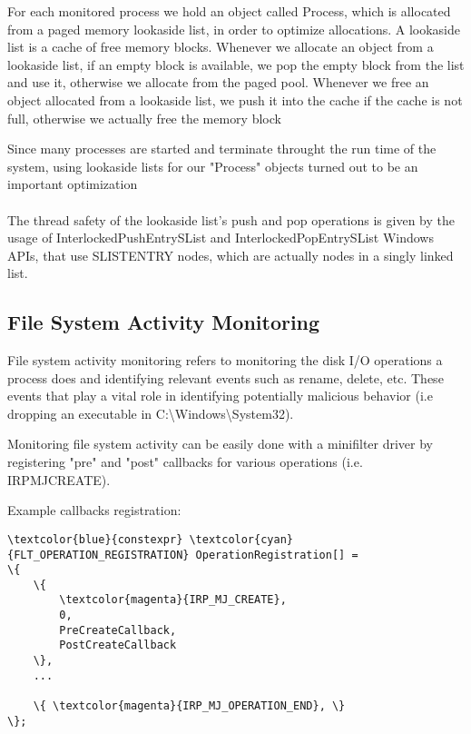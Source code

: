         For each monitored process we hold an object called Process, which is allocated from a paged memory lookaside list, in order to
        optimize allocations. A lookaside list is a cache of free memory blocks. Whenever we allocate an object from a lookaside list, if
        an empty block is available, we pop the empty block from the list and use it, otherwise we allocate from the paged pool. Whenever we free
        an object allocated from a lookaside list, we push it into the cache if the cache is not full, otherwise we actually free the memory
        block

        Since many processes are started and terminate throught the run time of the system, using lookaside lists for our "Process" objects
        turned out to be an important optimization
        
        \paragraph{}
        The thread safety of the lookaside list's push and pop operations is given by the usage of InterlockedPushEntrySList and
        InterlockedPopEntrySList Windows APIs, that use SLIST\textunderscore ENTRY nodes, which are actually nodes in a singly linked list.

        \subsection{File System Activity Monitoring}
        File system activity monitoring refers to monitoring the disk I/O operations a process does and identifying relevant events such as
        rename, delete, etc. These events that play a vital role in identifying potentially malicious behavior (i.e dropping an executable in
        C:\textbackslash Windows\textbackslash System32).
        
        Monitoring file system activity can be easily done with a minifilter driver by
        registering "pre" and "post" callbacks for various operations (i.e. IRP\textunderscore MJ\textunderscore CREATE).

    Example callbacks registration:

    \begin{Verbatim}[fontsize=\small, commandchars=\\\{\}]
\textcolor{blue}{constexpr} \textcolor{cyan}{FLT_OPERATION_REGISTRATION} OperationRegistration[] =
\{
    \{
        \textcolor{magenta}{IRP_MJ_CREATE},
        0,
        PreCreateCallback,
        PostCreateCallback
    \},
    ...
    
    \{ \textcolor{magenta}{IRP_MJ_OPERATION_END}, \}
\};
    \end{Verbatim}

